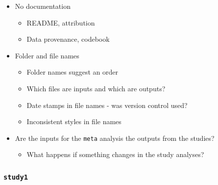 \documentclass[
]{article}
\providecommand{\tightlist}{%
  \setlength{\itemsep}{0pt}\setlength{\parskip}{0pt}}
\begin{document}
\begin{itemize}
\tightlist
\item
  No documentation

  \begin{itemize}
  \tightlist
  \item
    README, attribution
  \item
    Data provenance, codebook
  \end{itemize}
\item
  Folder and file names

  \begin{itemize}
  \tightlist
  \item
    Folder names suggest an order
  \item
    Which files are inputs and which are outputs?
  \item
    Date stamps in file names - was version control used?
  \item
    Inconsistent styles in file names
  \end{itemize}
\item
  Are the inputs for the \texttt{meta} analysis the outputs from the studies?

  \begin{itemize}
  \tightlist
  \item
    What happens if something changes in the study analyses?
  \end{itemize}
\end{itemize}

\hypertarget{study1}{%
\subsubsection{\texorpdfstring{\texttt{study1}}{study1}}\label{study1}}
\end{document}
